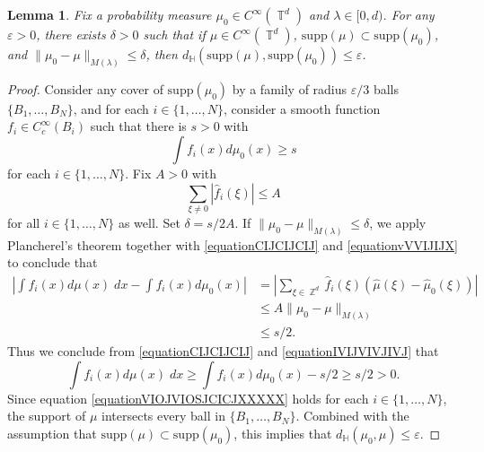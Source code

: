 \documentclass[dvipsnames,letterpaper,12pt]{article}
\numberwithin{equation}{section}
\DeclareMathOperator{\ZZ}{\mathbb{Z}}
\DeclareMathOperator{\TT}{\mathbb{T}}
\newtheorem{lemma}[theorem]{Lemma}
\numberwithin{theorem}{section}
\begin{document}
\begin{lemma} \label{LemmaTAOIAWOIDJ12301}
    Fix a probability measure $\mu_0 \in C^\infty(\TT^d)$ and $\lambda \in [0,d)$. For any $\varepsilon > 0$, there exists $\delta > 0$ such that if $\mu \in C^\infty(\TT^d)$, $\text{supp}(\mu) \subset \text{supp}(\mu_0)$, and $\| \mu_0 - \mu \|_{M(\lambda)} \leq \delta$, then $d_\mathbb{H}(\text{supp}(\mu),\text{supp}(\mu_0)) \leq \varepsilon$.
\end{lemma}
\begin{proof}
    Consider any cover of $\text{supp}(\mu_0)$ by a family of radius $\varepsilon/3$ balls $\{ B_1,\dots,B_N \}$, and for each $i \in \{ 1, \dots, N \}$, consider a smooth function $f_i \in C_c^\infty(B_i)$ such that there is $s > 0$ with
    \begin{equation} \label{equationCIJCIJCIJ}
        \int f_i(x) d\mu_0(x) \geq s
    \end{equation}
    for each $i \in \{ 1, \dots, N \}$. Fix $A > 0$ with
    \begin{equation} \label{equationvVVIJIJX}
        \sum_{\xi \neq 0} |\widehat{f}_i(\xi)| \leq A
    \end{equation}
    for all $i \in \{ 1, \dots, N \}$ as well. Set $\delta = s/2A$. If $\| \mu_0 - \mu \|_{M(\lambda)} \leq \delta$, we apply Plancherel's theorem together with \eqref{equationCIJCIJCIJ} and \eqref{equationvVVIJIJX} to conclude that
    \begin{equation} \label{equationIVIJVIVJIVJ}
    \begin{split}
        \left| \int f_i(x) d\mu(x)\; dx - \int f_i(x) d\mu_0(x) \right| &= \left| \sum_{\xi \in \ZZ^d} \widehat{f}_i(\xi) \left( \widehat{\mu}(\xi) - \widehat{\mu}_0(\xi) \right) \right|\\
        &\leq A \| \mu_0 - \mu \|_{M(\lambda)}\\
        &\leq s/2.
    \end{split}
    \end{equation}
    Thus we conclude from \eqref{equationCIJCIJCIJ} and \eqref{equationIVIJVIVJIVJ} that
    \begin{equation} \label{equationVIOJVIOSJCICJXXXXX}
        \int f_i(x) d\mu(x)\; dx \geq \int f_i(x) d\mu_0(x) - s/2 \geq s/2 > 0.
    \end{equation}
    Since equation \eqref{equationVIOJVIOSJCICJXXXXX} holds for each $i \in \{ 1,\dots, N \}$, the support of $\mu$ intersects every ball in $\{ B_1, \dots, B_N \}$. Combined with the assumption that $\text{supp}(\mu) \subset \text{supp}(\mu_0)$, this implies that $d_\mathbb{H}(\mu_0,\mu) \leq \varepsilon$.
\end{proof}
\end{document}
